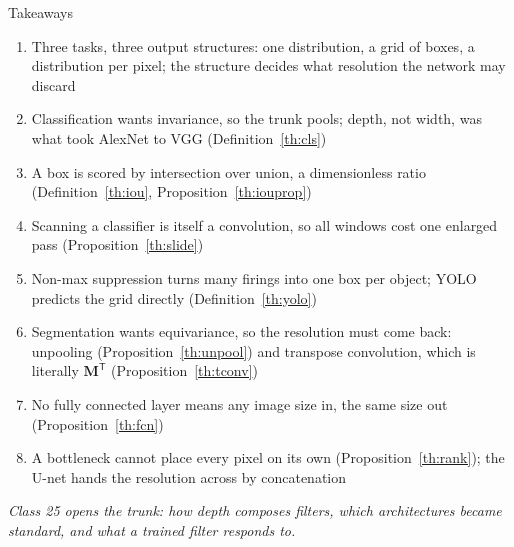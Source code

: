 \documentclass[aspectratio=169, 11pt]{beamer}
\newcommand{\bridge}[1]{%
  {\scriptsize\itshape\color{mcMuted} #1\par}\vspace{0.35em}}
\newcommand{\nosrc}{}       %
\begin{document}
\begin{frame}{Takeaways}
  \nosrc
  \vspace{-0.1em}
  {\scriptsize
  \begin{enumerate}\itemsep0.22em
    \item Three tasks, three output structures: one distribution, a
          grid of boxes, a distribution per pixel; the structure decides
          what resolution the network may discard
    \item Classification wants invariance, so the trunk pools; depth,
          not width, was what took AlexNet to VGG (Definition~\ref{th:cls})
    \item A box is scored by intersection over union, a dimensionless
          ratio (Definition~\ref{th:iou}, Proposition~\ref{th:iouprop})
    \item Scanning a classifier is itself a convolution, so all windows
          cost one enlarged pass (Proposition~\ref{th:slide})
    \item Non-max suppression turns many firings into one box per
          object; YOLO predicts the grid directly
          (Definition~\ref{th:yolo})
    \item Segmentation wants equivariance, so the resolution must come
          back: unpooling (Proposition~\ref{th:unpool}) and transpose
          convolution, which is literally $\mathbf{M}^{\mathsf T}$
          (Proposition~\ref{th:tconv})
    \item No fully connected layer means any image size in, the same
          size out (Proposition~\ref{th:fcn})
    \item A bottleneck cannot place every pixel on its own
          (Proposition~\ref{th:rank}); the U-net hands the resolution
          across by concatenation
  \end{enumerate}}
  \bridge{Class 25 opens the trunk: how depth composes filters, which
  architectures became standard, and what a trained filter responds to.}
\end{frame}
\end{document}
